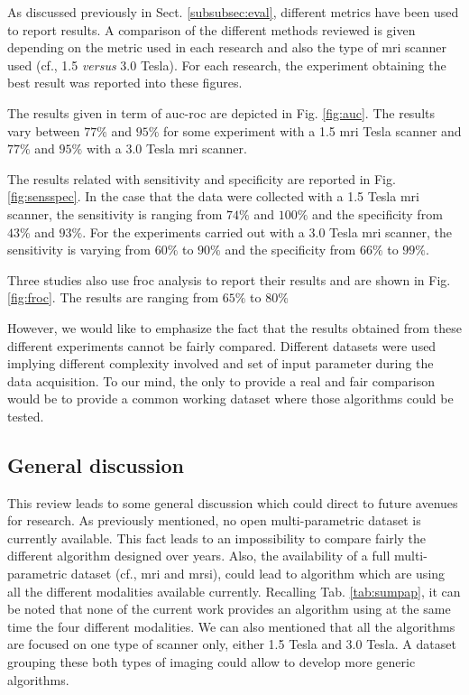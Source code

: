 As discussed previously in Sect. \ref{subsubsec:eval}, different metrics have been used to report results. A comparison of the different methods reviewed is given depending on the metric used in each research and also the type of \ac{mri} scanner used (cf., 1.5 \textit{versus} 3.0 Tesla). For each research, the experiment obtaining the best result was reported into these figures.

The results given in term of \ac{auc}-\ac{roc} are depicted in Fig. \ref{fig:auc}. The results vary between $77\%$ and $95\%$ for some experiment with a 1.5 \ac{mri} Tesla scanner and $77\%$ and $95\%$ with a 3.0 Tesla \ac{mri} scanner. 

The results related with sensitivity and specificity are reported in Fig. \ref{fig:sensspec}. In the case that the data were collected with a 1.5 Tesla \ac{mri} scanner, the sensitivity is ranging from $74\%$ and $100\%$ and the specificity from $43\%$ and $93\%$. For the experiments carried out with a 3.0 Tesla \ac{mri} scanner, the sensitivity is varying from $60\%$ to $90\%$ and the specificity from $66\%$ to $99\%$.

Three studies also use \ac{froc} analysis to report their results and are shown in Fig. \ref{fig:froc}. The results are ranging from $65\%$ to $80\%$

However, we would like to emphasize the fact that the results obtained from these different experiments cannot be fairly compared. Different datasets were used implying different complexity involved and set of input parameter during the data acquisition. To our mind, the only to provide a real and fair comparison would be to provide a common working dataset where those algorithms could be tested.

\subsection{General discussion}

This review leads to some general discussion which could direct to future avenues for research. As previously mentioned, no open multi-parametric dataset is currently available. This fact leads to an impossibility to compare fairly the different algorithm designed over years. Also, the availability of a full multi-parametric dataset (cf., \ac{mri} and \ac{mrsi}), could lead to algorithm which are using all the different modalities available currently. Recalling Tab. \ref{tab:sumpap}, it can be noted that none of the current work provides an algorithm using at the same time the four different modalities. We can also mentioned that all the algorithms are focused on one type of scanner only, either 1.5 Tesla and 3.0 Tesla. A dataset grouping these both types of imaging could allow to develop more generic algorithms.

